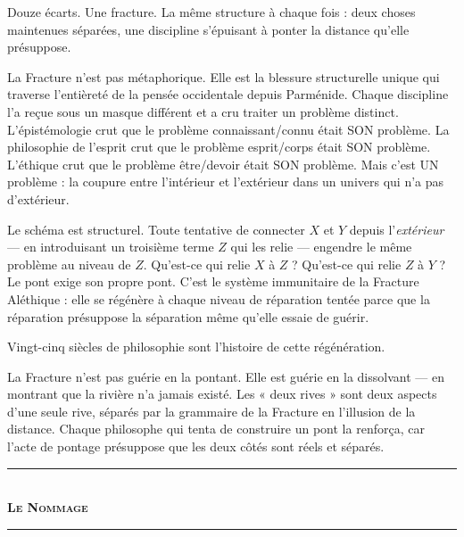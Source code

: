 \documentclass[10pt, openany, oneside]{book}
\renewcommand{\normalsize}{\fontsize{10}{13}\selectfont}
\begin{document}
Douze écarts. Une fracture. La même structure à chaque fois : deux choses maintenues séparées, une discipline s'épuisant à ponter la distance qu'elle présuppose.

La Fracture n'est pas métaphorique. Elle est la blessure structurelle unique qui traverse l'entièreté de la pensée occidentale depuis Parménide. Chaque discipline l'a reçue sous un masque différent et a cru traiter un problème distinct. L'épistémologie crut que le problème connaissant/connu était SON problème. La philosophie de l'esprit crut que le problème esprit/corps était SON problème. L'éthique crut que le problème être/devoir était SON problème. Mais c'est UN problème : la coupure entre l'intérieur et l'extérieur dans un univers qui n'a pas d'extérieur.

Le schéma est structurel. Toute tentative de connecter $X$ et $Y$ depuis l'\textit{extérieur} --- en introduisant un troisième terme $Z$ qui les relie --- engendre le même problème au niveau de $Z$. Qu'est-ce qui relie $X$ à $Z$ ? Qu'est-ce qui relie $Z$ à $Y$ ? Le pont exige son propre pont. C'est le système immunitaire de la Fracture Aléthique : elle se régénère à chaque niveau de réparation tentée parce que la réparation présuppose la séparation même qu'elle essaie de guérir.

Vingt-cinq siècles de philosophie sont l'histoire de cette régénération.

La Fracture n'est pas guérie en la pontant. Elle est guérie en la dissolvant --- en montrant que la rivière n'a jamais existé. Les « deux rives » sont deux aspects d'une seule rive, séparés par la grammaire de la Fracture en l'illusion de la distance. Chaque philosophe qui tenta de construire un pont la renforça, car l'acte de pontage présuppose que les deux côtés sont réels et séparés.

\vspace{1.5em}


\begin{center}
    \rule{0.3\textwidth}{0.4pt}\\[0.5em]
    {\normalsize\bfseries\scshape Le Nommage}\\[0.3em]
    \rule{0.3\textwidth}{0.4pt}
\end{center}

\vspace{1em}
\end{document}
